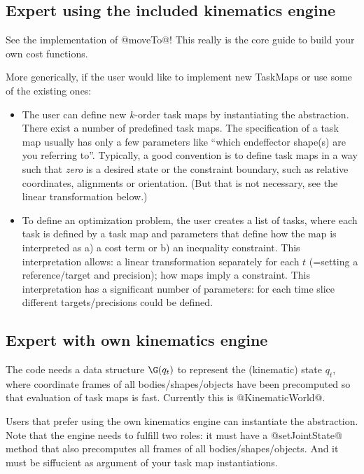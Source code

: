 \documentclass[10pt,fleqn,twoside]{article}
\begin{document}
\subsection{Expert using the included kinematics engine}

See the implementation of @moveTo@! This really is the core guide to
build your own cost functions.

More generically, if the user would like to implement new TaskMaps or
use some of the existing ones:
\begin{itemize}
\item The user can define new $k$-order task maps by instantiating the
abstraction. There exist a number of predefined task maps. The
specification of a task map usually has only a few parameters like
``which endeffector shape(s) are you referring to''. Typically, a good
convention is to define task maps in a way such that \emph{zero} is a
desired state or the constraint boundary, such as relative
coordinates, alignments or orientation. (But that is not necessary,
see the linear transformation below.)

\item To define an optimization problem, the user creates a list of
tasks, where each task is defined by a task map and parameters that
define how the map is interpreted as a) a cost term or b) an inequality
constraint. This interpretation allows: a linear
transformation separately for each $t$ (=setting a reference/target
and precision); how maps imply a constraint. This interpretation has a
significant number of parameters: for each time slice different
targets/precisions could be defined.
\end{itemize}


\subsection{Expert with own kinematics engine}

The code needs a data structure $\G(q_t)$ to represent the
(kinematic) state $q_t$, where coordinate frames of all
bodies/shapes/objects have been precomputed so that evaluation of task
maps is fast. Currently this is @KinematicWorld@.

Users that prefer using the own kinematics engine can instantiate the
abstraction. Note that the engine needs to fulfill two roles: it must
have a @setJointState@ method that also precomputes all frames of all
bodies/shapes/objects. And it must be siffucient as argument of your
task map instantiations.
\end{document}

